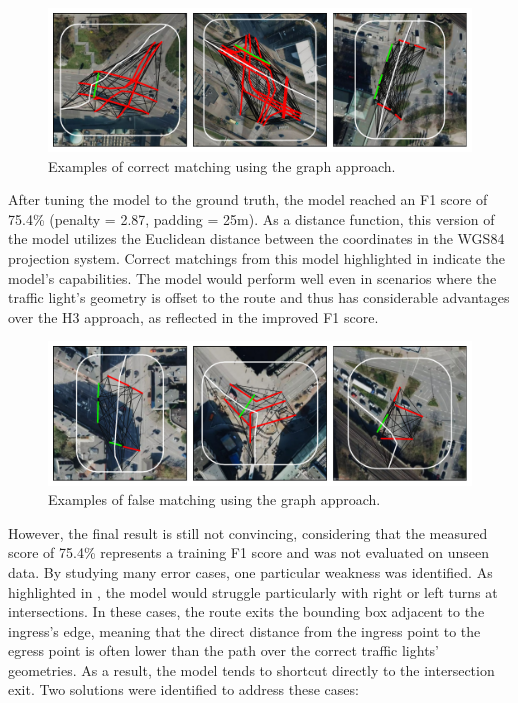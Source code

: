 \begin{figure}[t]
\centering
\includegraphics[width=\linewidth]{images/matching-dijkstra-correct.pdf}
\caption{Examples of correct matching using the graph approach.}
\label{fig:sg-selection-graph-example}
\end{figure}

After tuning the model to the ground truth, the model reached an F1 score of 75.4\% (penalty = 2.87, padding = 25m). As a distance function, this version of the model utilizes the Euclidean distance between the coordinates in the WGS84 projection system. Correct matchings from this model highlighted in  indicate the model's capabilities. The model would perform well even in scenarios where the traffic light's geometry is offset to the route and thus has considerable advantages over the H3 approach, as reflected in the improved F1 score.

\begin{figure}[t]
\centering
\includegraphics[width=\linewidth]{images/matching-dijkstra-incorrect.pdf}
\caption{Examples of false matching using the graph approach.}
\label{fig:sg-selection-graph-fails}
\end{figure}

However, the final result is still not convincing, considering that the measured score of 75.4\% represents a training F1 score and was not evaluated on unseen data. By studying many error cases, one particular weakness was identified. As highlighted in , the model would struggle particularly with right or left turns at intersections. In these cases, the route exits the bounding box adjacent to the ingress's edge, meaning that the direct distance from the ingress point to the egress point is often lower than the path over the correct traffic lights' geometries. As a result, the model tends to shortcut directly to the intersection exit. Two solutions were identified to address these cases:

